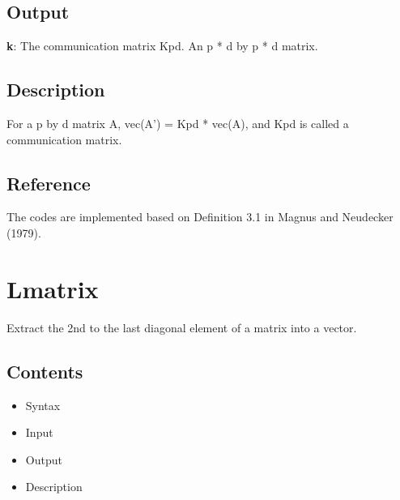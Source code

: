 \documentclass[a4paper,11pt,openany]{memoir}
\begin{document}
\subsection*{Output}

\begin{par}
\textbf{k}: The communication matrix Kpd. An p * d by p * d matrix.
\end{par} \vspace{1em}


\subsection*{Description}

\begin{par}
For a p by d matrix A, vec(A') = Kpd * vec(A), and Kpd is called a communication matrix.
\end{par} \vspace{1em}


\subsection*{Reference}

\begin{par}
The codes are implemented based on Definition 3.1 in Magnus and Neudecker (1979).
\end{par} \vspace{1em}

\newpage

\rmfamily
\color{black}\section{Lmatrix}

\begin{par}
Extract the 2nd to the last diagonal element of a matrix into a vector.
\end{par} \vspace{1em}

\subsection*{Contents}

\begin{itemize}
\setlength{\itemsep}{-1ex}
   \item Syntax
   \item Input
   \item Output
   \item Description
\end{itemize}
\end{document}
